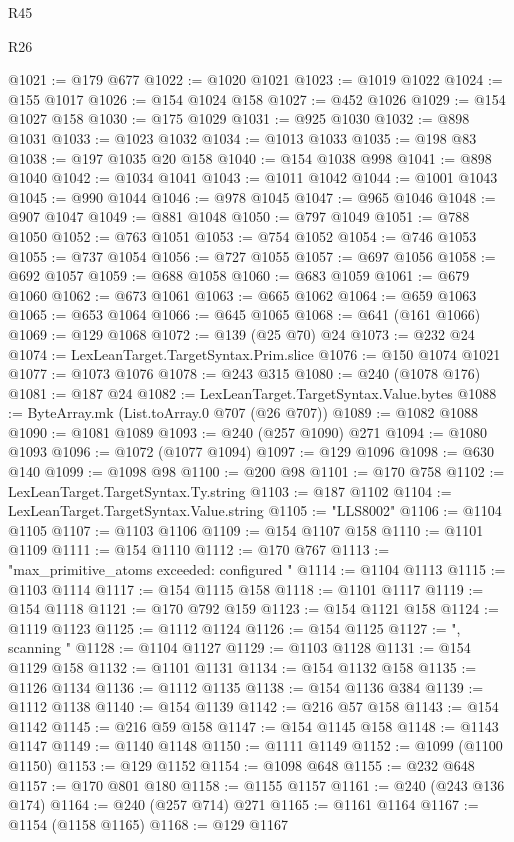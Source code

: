 \begin{lexlean}{R45}
\begin{lexlean}{R26}
\begin{coremodule}
{{{{{{{{{{{{{{{{{{{{{{{{{{{{{{{{{{{{{{{{{{{{{{{{{{{{{{{{{{{{{{{{{{{{{{{{@1021 := @179 @677
@1022 := @1020 @1021
@1023 := @1019 @1022
@1024 := @155 @1017
@1026 := @154 @1024 @158
@1027 := @452 @1026
@1029 := @154 @1027 @158
@1030 := @175 @1029
@1031 := @925 @1030
@1032 := @898 @1031
@1033 := @1023 @1032
@1034 := @1013 @1033
@1035 := @198 @83
@1038 := @197 @1035 @20 @158
@1040 := @154 @1038 @998
@1041 := @898 @1040
@1042 := @1034 @1041
@1043 := @1011 @1042
@1044 := @1001 @1043
@1045 := @990 @1044
@1046 := @978 @1045
@1047 := @965 @1046
@1048 := @907 @1047
@1049 := @881 @1048
@1050 := @797 @1049
@1051 := @788 @1050
@1052 := @763 @1051
@1053 := @754 @1052
@1054 := @746 @1053
@1055 := @737 @1054
@1056 := @727 @1055
@1057 := @697 @1056
@1058 := @692 @1057
@1059 := @688 @1058
@1060 := @683 @1059
@1061 := @679 @1060
@1062 := @673 @1061
@1063 := @665 @1062
@1064 := @659 @1063
@1065 := @653 @1064
@1066 := @645 @1065
@1068 := @641 (@161 @1066)
@1069 := @129 @1068
@1072 := @139 (@25 @70) @24
@1073 := @232 @24
@1074 := LexLeanTarget.TargetSyntax.Prim.slice
@1076 := @150 @1074 @1021
@1077 := @1073 @1076
@1078 := @243 @315
@1080 := @240 (@1078 @176)
@1081 := @187 @24
@1082 := LexLeanTarget.TargetSyntax.Value.bytes
@1088 := ByteArray.mk (List.toArray.{0} @707 (@26 @707))
@1089 := @1082 @1088
@1090 := @1081 @1089
@1093 := @240 (@257 @1090) @271
@1094 := @1080 @1093
@1096 := @1072 (@1077 @1094)
@1097 := @129 @1096
@1098 := @630 @140
@1099 := @1098 @98
@1100 := @200 @98
@1101 := @170 @758
@1102 := LexLeanTarget.TargetSyntax.Ty.string
@1103 := @187 @1102
@1104 := LexLeanTarget.TargetSyntax.Value.string
@1105 := "LLS8002"
@1106 := @1104 @1105
@1107 := @1103 @1106
@1109 := @154 @1107 @158
@1110 := @1101 @1109
@1111 := @154 @1110
@1112 := @170 @767
@1113 := "max_primitive_atoms exceeded: configured "
@1114 := @1104 @1113
@1115 := @1103 @1114
@1117 := @154 @1115 @158
@1118 := @1101 @1117
@1119 := @154 @1118
@1121 := @170 @792 @159
@1123 := @154 @1121 @158
@1124 := @1119 @1123
@1125 := @1112 @1124
@1126 := @154 @1125
@1127 := ", scanning "
@1128 := @1104 @1127
@1129 := @1103 @1128
@1131 := @154 @1129 @158
@1132 := @1101 @1131
@1134 := @154 @1132 @158
@1135 := @1126 @1134
@1136 := @1112 @1135
@1138 := @154 @1136 @384
@1139 := @1112 @1138
@1140 := @154 @1139
@1142 := @216 @57 @158
@1143 := @154 @1142
@1145 := @216 @59 @158
@1147 := @154 @1145 @158
@1148 := @1143 @1147
@1149 := @1140 @1148
@1150 := @1111 @1149
@1152 := @1099 (@1100 @1150)
@1153 := @129 @1152
@1154 := @1098 @648
@1155 := @232 @648
@1157 := @170 @801 @180
@1158 := @1155 @1157
@1161 := @240 (@243 @136 @174)
@1164 := @240 (@257 @714) @271
@1165 := @1161 @1164
@1167 := @1154 (@1158 @1165)
@1168 := @129 @1167
}}}}}}}}}}}}}}}}}}}}}}}}}}}}}}}}}}}}}}}}}}}}}}}}}}}}}}}}}}}}}}}}}}}}}}}}
\end{coremodule}
\end{lexlean}
\end{lexlean}
